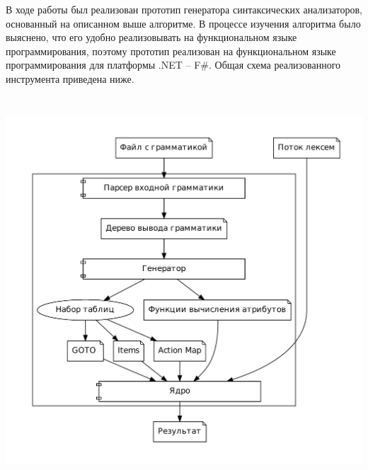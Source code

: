 
В ходе работы был реализован прототип генератора синтаксических анализаторов, основанный на описанном выше алгоритме. В процессе изучения алгоритма было выяснено, что его удобно реализовывать на функциональном языке программирования, поэтому  прототип реализован на функциональном языке программирования для платформы .NET -- F\#. Общая схема реализованного инструмента приведена ниже.


\begin{center}
  \includegraphics[height = 14.5cm]{general_tool_structure.pdf}
	\label{fig:general_tool_structure}
\end{center}

